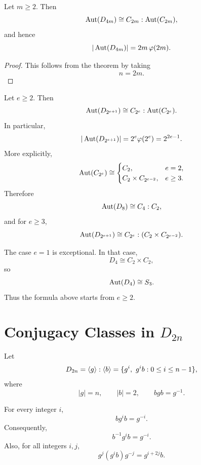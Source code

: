     \begin{corollary}
    Let $m\geq 2$. Then
    \[
        \operatorname{Aut}(D_{4m})
        \cong
        C_{2m}:\operatorname{Aut}(C_{2m}),
    \]
    and hence
    \[
        |\operatorname{Aut}(D_{4m})|
        =
        2m\,\varphi(2m).
    \]
    \end{corollary}
    
    \begin{proof}
    This follows from the theorem by taking
    \[
        n=2m.
    \]
    \end{proof}
    
    \begin{corollary}
    Let $e\geq 2$. Then
    \[
        \operatorname{Aut}(D_{2^{e+1}})
        \cong
        C_{2^e}:\operatorname{Aut}(C_{2^e}).
    \]
    In particular,
    \[
        |\operatorname{Aut}(D_{2^{e+1}})|
        =
        2^e\varphi(2^e)
        =
        2^{2e-1}.
    \]
    More explicitly,
    \[
        \operatorname{Aut}(C_{2^e})
        \cong
        \begin{cases}
            C_2, & e=2,\\
            C_2\times C_{2^{e-2}}, & e\geq 3.
        \end{cases}
    \]
    Therefore
    \[
        \operatorname{Aut}(D_8)\cong C_4:C_2,
    \]
    and for $e\geq 3$,
    \[
        \operatorname{Aut}(D_{2^{e+1}})
        \cong
        C_{2^e}:(C_2\times C_{2^{e-2}}).
    \]
    \end{corollary}
    
    \begin{remark}
    The case $e=1$ is exceptional. In that case,
    \[
        D_4\cong C_2\times C_2,
    \]
    so
    \[
        \operatorname{Aut}(D_4)\cong S_3.
    \]
    Thus the formula above starts from $e\geq 2$.
    \end{remark}

\section{Conjugacy Classes in \texorpdfstring{$D_{2n}$}{D2n}}

Let
\[
    D_{2n}
    =
    \langle g\rangle:\langle b\rangle
    =
    \{g^i,\ g^i b:0\leq i\leq n-1\},
\]
where
\[
    |g|=n,
    \qquad
    |b|=2,
    \qquad
    bgb=g^{-1}.
\]

\begin{lemma}
For every integer $i$,
\[
    bg^i b=g^{-i}.
\]
Consequently,
\[
    b^{-1}g^i b=g^{-i}.
\]
Also, for all integers $i,j$,
\[
    g^j(g^i b)g^{-j}
    =
    g^{i+2j}b.
\]
\end{lemma}

